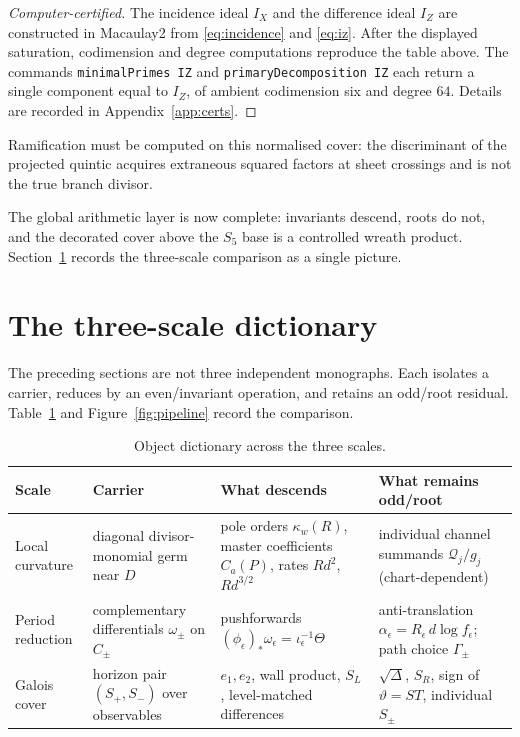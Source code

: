 \documentclass[11pt,a4paper]{article}
\theoremstyle{definition}
\theoremstyle{remark}
\newcommand{\disc}{\Delta}
\begin{document}
\begin{proof}[Computer-certified]
The incidence ideal \(I_X\) and the difference ideal \(I_Z\) are constructed in
Macaulay2 from \eqref{eq:incidence} and \eqref{eq:iz}. After the displayed
saturation, codimension and degree computations reproduce the table above.
The commands \texttt{minimalPrimes IZ} and \texttt{primaryDecomposition IZ}
each return a single component equal to \(I_Z\), of ambient codimension six and
degree \(64\). Details are recorded in Appendix~\ref{app:certs}.
\end{proof}

Ramification must be computed on this normalised cover: the discriminant of the
projected quintic acquires extraneous squared factors at sheet crossings and is
not the true branch divisor.

The global arithmetic layer is now complete: invariants descend, roots do not,
and the decorated cover above the \(S_5\) base is a controlled wreath product.
Section~\ref{sec:dictionary} records the three-scale comparison as a single
picture.

\section{The three-scale dictionary}
\label{sec:dictionary}

The preceding sections are not three independent monographs. Each isolates a
carrier, reduces by an even/invariant operation, and retains an odd/root
residual. Table~\ref{tab:dict} and Figure~\ref{fig:pipeline} record the
comparison.

\begin{table}[htbp]
\centering
\caption{Object dictionary across the three scales.}
\label{tab:dict}
\renewcommand{\arraystretch}{1.2}
\begin{tabularx}{\textwidth}{@{}>{\raggedright\arraybackslash}p{}
>{\raggedright\arraybackslash}X
>{\raggedright\arraybackslash}X
>{\raggedright\arraybackslash}X@{}}
\toprule
\textbf{Scale} & \textbf{Carrier} & \textbf{What descends} & \textbf{What remains odd/root}\\
\midrule
Local curvature
  & diagonal divisor-monomial germ near \(D\)
  & pole orders \(\kappa_w(R)\), master coefficients \(C_a(P)\), rates \(Rd^2\), \(Rd^{3/2}\)
  & individual channel summands \(\mathcal Q_j/g_j\) (chart-dependent)\\
Period reduction
  & complementary differentials \(\omega_\pm\) on \(C_\pm\)
  & pushforwards \((\phi_\epsilon)_*\omega_\epsilon=\iota_\epsilon^{-1}\Theta\)
  & anti-translation \(\alpha_\epsilon=R_\epsilon\,d\log f_\epsilon\); path choice \(\Gamma_\pm\)\\
Galois cover
  & horizon pair \((S_+,S_-)\) over observables
  & \(e_1,e_2\), wall product, \(S_L\), level-matched differences
  & \(\sqrt{\disc}\), \(S_R\), sign of \(\vartheta=ST\), individual \(S_\pm\)\\
\bottomrule
\end{tabularx}
\end{table}
\end{document}

